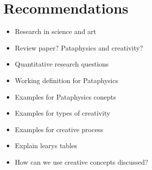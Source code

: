 
\section{Recommendations}

\begin{itemize}
\item Research in science and art
\item Review paper? Pataphysics and creativity?
\item Quantitative research questions
\item Working definition for Pataphysics
\item Examples for Pataphysics conepts
\item Examples for types of creativity
\item Examples for creative process
\item Explain learys tables
\item How can we use creative concepts discussed?
\end{itemize}
